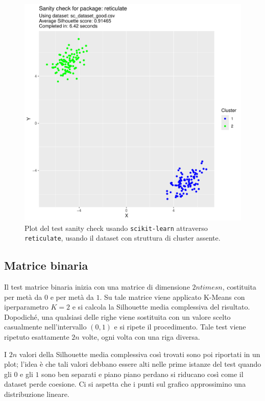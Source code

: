 \documentclass[italian]{article}
\begin{document}
			\begin{figure}[h]
				\includegraphics[width = \textwidth, page = 2]{results/results_RETICULATE.pdf}
				\caption{Plot del test sanity check usando \texttt{scikit-learn} attraverso
				\texttt{reticulate}, usando il dataset con struttura di cluster assente.}
				\label{fig:reticulatebad}
			\end{figure}

		\subsection{Matrice binaria}

			Il test matrice binaria inizia con una matrice di dimensione
			$2n times n$, costituita per metà da $0$ e per metà da $1$.
			Su tale matrice viene applicato K-Means con iperparametro
			$K = 2$ e si calcola la Silhouette media complessiva del
			risultato. Dopodiché, una qualsiasi delle righe viene sostituita
			con un valore scelto casualmente nell'intervallo $(0, 1)$ e si
			ripete il procedimento. Tale test viene ripetuto esattamente
			$2n$ volte, ogni volta con una riga diversa.

			I $2n$ valori della Silhouette media complessiva così trovati
			sono poi riportati in un plot; l'idea è che tali valori debbano
			essere alti nelle prime istanze del test quando gli $0$ e gli
			$1$ sono ben separati e piano piano perdano si riducano così
			come il dataset perde coesione. Ci si aspetta che i punti sul
			grafico approssimino una distribuzione lineare.
\end{document}
